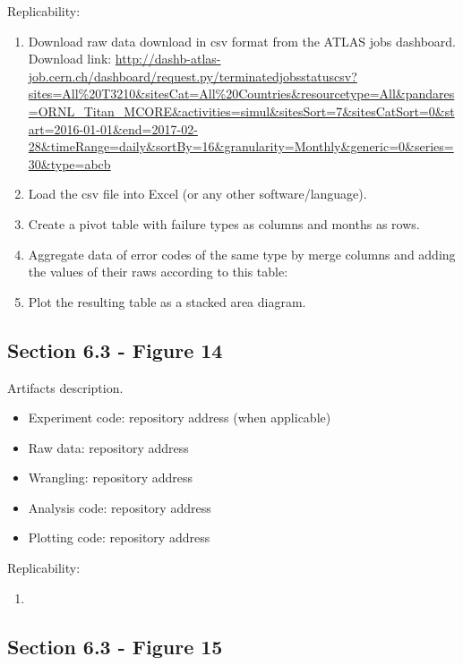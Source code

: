 Replicability:

\begin{enumerate}
    \item Download raw data download in csv format from the ATLAS jobs dashboard. Download link: \url{http://dashb-atlas-job.cern.ch/dashboard/request.py/terminatedjobsstatuscsv?sites=All%20T3210&sitesCat=All%20Countries&resourcetype=All&pandares=ORNL_Titan_MCORE&activities=simul&sitesSort=7&sitesCatSort=0&start=2016-01-01&end=2017-02-28&timeRange=daily&sortBy=16&granularity=Monthly&generic=0&series=30&type=abcb}
    \item Load the csv file into Excel (or any other software/language).
    \item Create a pivot table with failure types as columns and months as rows.
    \item Aggregate data of error codes of the same type by merge columns and adding the values of their raws according to this table:
    \item Plot the resulting table as a stacked area diagram.
\end{enumerate}


\subsection{Section 6.3 - Figure 14}
\label{apndx:fig14}

Artifacts description.

\begin{itemize}
    \item Experiment code: repository address (when applicable)
    \item Raw data: repository address
    \item Wrangling: repository address
    \item Analysis code: repository address
    \item Plotting code: repository address
\end{itemize}

Replicability:

\begin{enumerate}
    \item
\end{enumerate}


\subsection{Section 6.3 - Figure 15}
\label{apndx:fig15}

